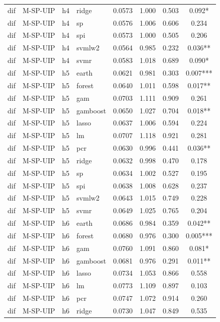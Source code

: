 \begin{ThreePartTable}
\begin{longtable}[t]{llclcccc}
dif & M-SP-UIP & h4 & ridge & 0.0573 & 1.000 & 0.503 & 0.092*\\
dif & M-SP-UIP & h4 & sp & 0.0576 & 1.006 & 0.606 & 0.234\\
dif & M-SP-UIP & h4 & spi & 0.0573 & 1.000 & 0.505 & 0.206\\
dif & M-SP-UIP & h4 & svmlw2 & 0.0564 & 0.985 & 0.232 & 0.036**\\
dif & M-SP-UIP & h4 & svmr & 0.0583 & 1.018 & 0.689 & 0.090*\\
\addlinespace
dif & M-SP-UIP & h5 & earth & 0.0621 & 0.981 & 0.303 & 0.007***\\
dif & M-SP-UIP & h5 & forest & 0.0640 & 1.011 & 0.598 & 0.017**\\
dif & M-SP-UIP & h5 & gam & 0.0703 & 1.111 & 0.909 & 0.261\\
dif & M-SP-UIP & h5 & gamboost & 0.0650 & 1.027 & 0.704 & 0.018**\\
dif & M-SP-UIP & h5 & lasso & 0.0637 & 1.006 & 0.594 & 0.224\\
dif & M-SP-UIP & h5 & lm & 0.0707 & 1.118 & 0.921 & 0.281\\
dif & M-SP-UIP & h5 & pcr & 0.0630 & 0.996 & 0.441 & 0.036**\\
dif & M-SP-UIP & h5 & ridge & 0.0632 & 0.998 & 0.470 & 0.178\\
dif & M-SP-UIP & h5 & sp & 0.0634 & 1.002 & 0.527 & 0.195\\
dif & M-SP-UIP & h5 & spi & 0.0638 & 1.008 & 0.628 & 0.237\\
dif & M-SP-UIP & h5 & svmlw2 & 0.0643 & 1.015 & 0.749 & 0.228\\
dif & M-SP-UIP & h5 & svmr & 0.0649 & 1.025 & 0.765 & 0.204\\
\addlinespace
dif & M-SP-UIP & h6 & earth & 0.0686 & 0.984 & 0.359 & 0.042**\\
dif & M-SP-UIP & h6 & forest & 0.0680 & 0.976 & 0.300 & 0.005***\\
dif & M-SP-UIP & h6 & gam & 0.0760 & 1.091 & 0.860 & 0.081*\\
dif & M-SP-UIP & h6 & gamboost & 0.0681 & 0.976 & 0.291 & 0.011**\\
dif & M-SP-UIP & h6 & lasso & 0.0734 & 1.053 & 0.866 & 0.558\\
dif & M-SP-UIP & h6 & lm & 0.0773 & 1.109 & 0.897 & 0.103\\
dif & M-SP-UIP & h6 & pcr & 0.0747 & 1.072 & 0.914 & 0.260\\
dif & M-SP-UIP & h6 & ridge & 0.0730 & 1.047 & 0.849 & 0.535\\

\end{longtable}
\end{ThreePartTable}

